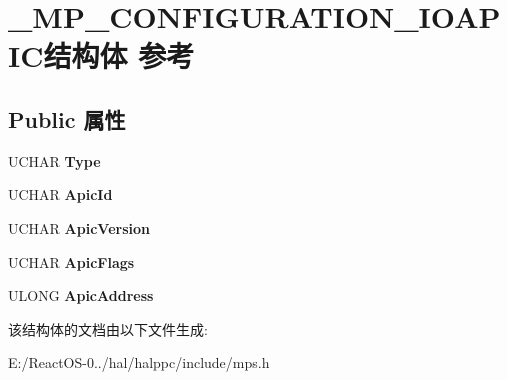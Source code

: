 \hypertarget{struct___m_p___c_o_n_f_i_g_u_r_a_t_i_o_n___i_o_a_p_i_c}{}\section{\+\_\+\+M\+P\+\_\+\+C\+O\+N\+F\+I\+G\+U\+R\+A\+T\+I\+O\+N\+\_\+\+I\+O\+A\+P\+I\+C结构体 参考}
\label{struct___m_p___c_o_n_f_i_g_u_r_a_t_i_o_n___i_o_a_p_i_c}
\subsection*{Public 属性}
\begin{DoxyCompactItemize}
\item 
\mbox{\label{struct___m_p___c_o_n_f_i_g_u_r_a_t_i_o_n___i_o_a_p_i_c_accd4638e3c274eabe70aad32fd297ca3}} 
U\+C\+H\+AR {\bfseries Type}
\item 
\mbox{\label{struct___m_p___c_o_n_f_i_g_u_r_a_t_i_o_n___i_o_a_p_i_c_aceb1a748b787efea9d7f7ae0d9a03496}} 
U\+C\+H\+AR {\bfseries Apic\+Id}
\item 
\mbox{\label{struct___m_p___c_o_n_f_i_g_u_r_a_t_i_o_n___i_o_a_p_i_c_a465707401fbdc9b91ffcd64b91dea82a}} 
U\+C\+H\+AR {\bfseries Apic\+Version}
\item 
\mbox{\label{struct___m_p___c_o_n_f_i_g_u_r_a_t_i_o_n___i_o_a_p_i_c_a63bcbd4b1f63bde77a4e64aab38dd0a9}} 
U\+C\+H\+AR {\bfseries Apic\+Flags}
\item 
\mbox{\label{struct___m_p___c_o_n_f_i_g_u_r_a_t_i_o_n___i_o_a_p_i_c_a23312c11e7a15f629379d11dde4963f2}} 
U\+L\+O\+NG {\bfseries Apic\+Address}
\end{DoxyCompactItemize}


该结构体的文档由以下文件生成\+:\begin{DoxyCompactItemize}
\item 
E\+:/\+React\+O\+S-\/0../hal/halppc/include/mps.\+h\end{DoxyCompactItemize}
